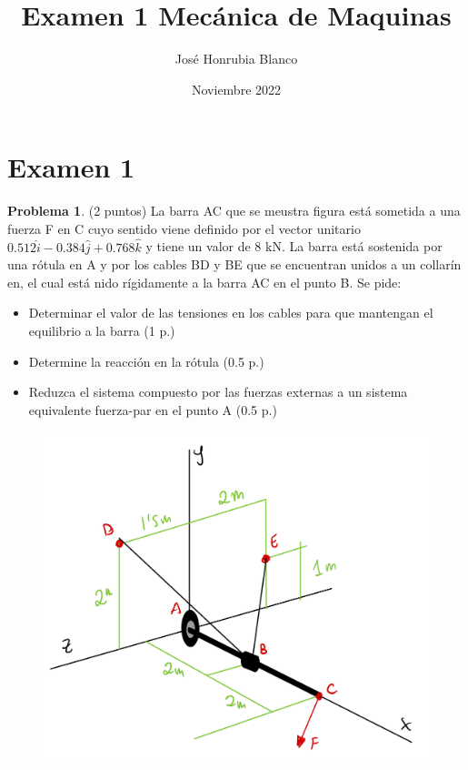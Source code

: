 \documentclass[10pt]{article}
\title{Examen 1 Mecánica de Maquinas}
\author{José Honrubia Blanco }
\date{Noviembre 2022}
\begin{document}
\section{Examen 1}
\textbf{Problema 1}. (2 puntos) La barra AC que se meustra figura está sometida a una fuerza F en C cuyo sentido viene definido por el vector unitario $0.512\hat{i} - 0.384\hat{j} + 0.768\hat{k}$ y tiene un valor de 8 kN. La barra está sostenida por una rótula en A y por los cables BD y BE que se encuentran unidos a un collarín en, el cual está nido rígidamente a la barra AC en el punto B. Se pide:
\begin{itemize}
    \item Determinar el valor de las tensiones en los cables para que mantengan el equilibrio a la barra (1 p.)
    \item Determine la reacción en la rótula (0.5 p.)
    \item Reduzca el sistema compuesto por las fuerzas externas a un sistema equivalente fuerza-par en el punto A (0.5 p.)
\end{itemize}
\begin{figure}[h!]
    \centering
    \includegraphics[width=0.35\linewidth]{problema_1.jpeg}
    \label{fig:}
  \end{figure}
\end{document}

